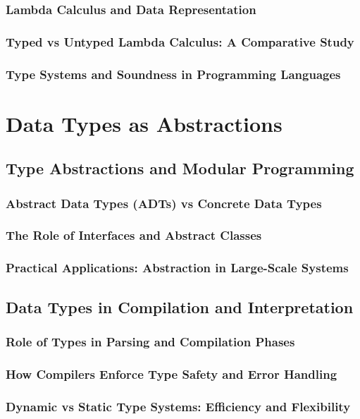 \documentclass[12pt, oneside]{book}
\begin{document}
\subsubsection{Lambda Calculus and Data Representation}
\subsubsection{Typed vs Untyped Lambda Calculus: A Comparative Study}
\subsubsection{Type Systems and Soundness in Programming Languages}

\section{Data Types as Abstractions}
\subsection{Type Abstractions and Modular Programming}
\subsubsection{Abstract Data Types (ADTs) vs Concrete Data Types}
\subsubsection{The Role of Interfaces and Abstract Classes}
\subsubsection{Practical Applications: Abstraction in Large-Scale Systems}
\subsection{Data Types in Compilation and Interpretation}
\subsubsection{Role of Types in Parsing and Compilation Phases}
\subsubsection{How Compilers Enforce Type Safety and Error Handling}
\subsubsection{Dynamic vs Static Type Systems: Efficiency and Flexibility}
\end{document}
